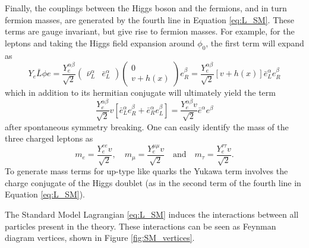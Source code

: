 Finally, the couplings between the Higgs boson and the fermions, and in turn fermion masses, are generated by the fourth line in Equation \eqref{eq:L_SM}. These terms are gauge invariant, but give rise to fermion masses. For example, for the leptons and taking the Higgs field expansion around $\phi_0$, the first term will expand as
\begin{equation*}
    Y_{e}\bar{L}\phi e = \frac{Y_e^{\alpha\beta}}{\sqrt{2}}
    \begin{pmatrix}
        \bar{\nu}_{L}^{\alpha} & \bar{e}_{L}^{\alpha}
    \end{pmatrix}
    \begin{pmatrix}
        0\\
        v + h(x)
    \end{pmatrix}
    e_{R}^{\beta} = \frac{Y_e^{\alpha\beta}}{\sqrt{2}}\left[v + h(x)\right] \bar{e}_{L}^{\alpha}e_{R}^{\beta}
\end{equation*}
which in addition to its hermitian conjugate will ultimately yield the term
\begin{equation*}
    \frac{Y_e^{\alpha\beta}}{\sqrt{2}} v \left[\bar{e}_{L}^{\alpha}e_{R}^{\beta} + \bar{e}_{R}^{\alpha}e_{L}^{\beta}\right] = \frac{Y_e^{\alpha\beta}v}{\sqrt{2}} \bar{e}^{\alpha}e^{\beta}
\end{equation*}
after spontaneous symmetry breaking. One can easily identify the mass of the three charged leptons as
\begin{equation*}
    m_{e} = \frac{Y_e^{ee} v}{\sqrt{2}},\quad m_{\mu} = \frac{Y_e^{\mu\mu} v}{\sqrt{2}}\quad\text{and}\quad m_{\tau} = \frac{Y_e^{\tau\tau} v}{\sqrt{2}}.
\end{equation*}
To generate mass terms for up-type like quarks the Yukawa term involves the charge conjugate of the Higgs doublet (as in the second term of the fourth line in Equation \eqref{eq:L_SM}).

The Standard Model Lagrangian \eqref{eq:L_SM} induces the interactions between all particles present in the theory. These interactions can be seen as Feynman diagram vertices, shown in Figure \ref{fig:SM_vertices}.


